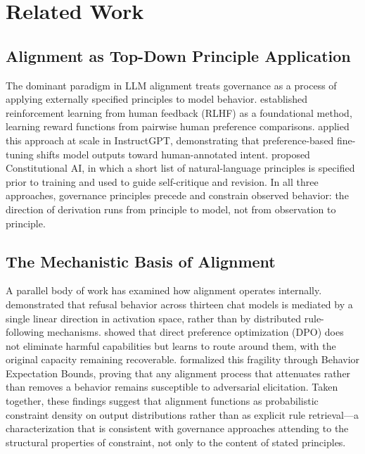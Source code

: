 \documentclass[11pt,a4paper]{article}
\begin{document}
\section{Related Work}

\subsection{Alignment as Top-Down Principle Application}

The dominant paradigm in LLM alignment treats governance as a process of applying externally specified principles to model behavior. \citet{christiano2017} established reinforcement learning from human feedback (RLHF) as a foundational method, learning reward functions from pairwise human preference comparisons. \citet{ouyang2022} applied this approach at scale in InstructGPT, demonstrating that preference-based fine-tuning shifts model outputs toward human-annotated intent. \citet{bai2022} proposed Constitutional AI, in which a short list of natural-language principles is specified prior to training and used to guide self-critique and revision. In all three approaches, governance principles precede and constrain observed behavior: the direction of derivation runs from principle to model, not from observation to principle.

\subsection{The Mechanistic Basis of Alignment}

A parallel body of work has examined how alignment operates internally. \citet{arditi2024} demonstrated that refusal behavior across thirteen chat models is mediated by a single linear direction in activation space, rather than by distributed rule-following mechanisms. \citet{lee2024} showed that direct preference optimization (DPO) does not eliminate harmful capabilities but learns to route around them, with the original capacity remaining recoverable. \citet{wolf2024} formalized this fragility through Behavior Expectation Bounds, proving that any alignment process that attenuates rather than removes a behavior remains susceptible to adversarial elicitation. Taken together, these findings suggest that alignment functions as probabilistic constraint density on output distributions rather than as explicit rule retrieval---a characterization that is consistent with governance approaches attending to the structural properties of constraint, not only to the content of stated principles.
\end{document}
